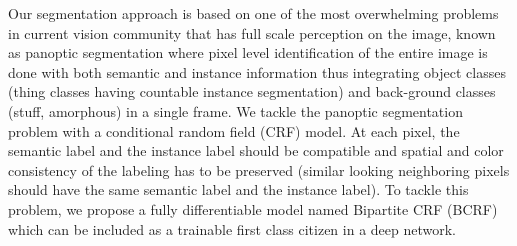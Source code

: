 Our segmentation approach is based on one of the most overwhelming problems in current vision community that has full scale perception on the image, known as panoptic segmentation where pixel level identification of the entire image is done with both semantic and instance information thus integrating object classes (thing classes having countable instance segmentation) and back-ground classes (stuff, amorphous) in a single frame. We tackle the panoptic segmentation problem with a conditional random field (CRF) model. At each pixel, the semantic label and the instance label should be compatible and spatial and color consistency of the labeling has to be preserved (similar looking neighboring pixels should have the same semantic label and the instance label). To tackle this problem, we propose a fully differentiable model named Bipartite CRF (BCRF) which can be included as a trainable first class citizen in a deep network.

